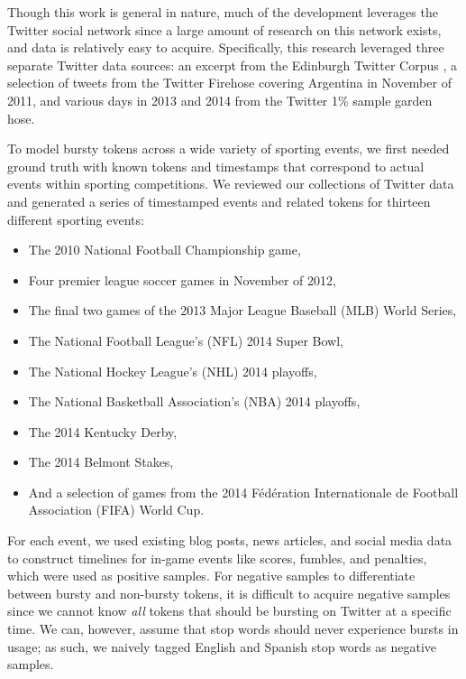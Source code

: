 \documentclass{acm_proc_article-sp}
\begin{document}
Though this work is general in nature, much of the development leverages the Twitter social network since a large amount of research on this network exists, and data is relatively easy to acquire.
Specifically, this research leveraged three separate Twitter data sources: an excerpt from the Edinburgh Twitter Corpus \cite{Petrovic:2010:ETC:1860667.1860680}, a selection of tweets from the Twitter Firehose covering Argentina in November of 2011, and various days in 2013 and 2014 from the Twitter 1\% sample garden hose.

To model bursty tokens across a wide variety of sporting events, we first needed ground truth with known tokens and timestamps that correspond to actual events within sporting competitions.
We reviewed our collections of Twitter data and generated a series of timestamped events and related tokens for thirteen different sporting events: 

\begin{itemize}
\item The 2010 National Football Championship game, 
\item Four premier league soccer games in November of 2012, %
\item The final two games of the 2013 Major League Baseball (MLB) World Series, 
\item The National Football League's (NFL) 2014 Super Bowl, 
\item The National Hockey League's (NHL) 2014 playoffs, 
\item The National Basketball Association's (NBA) 2014 playoffs, 
\item The 2014 Kentucky Derby, 
\item The 2014 Belmont Stakes, 
\item And a selection of games from the 2014 F\'{e}d\'{e}ration Internationale de Football Association (FIFA) World Cup.
\end{itemize}

For each event, we used existing blog posts, news articles, and social media data to construct timelines for in-game events like scores, fumbles, and penalties, which were used as positive samples.
For negative samples to differentiate between bursty and non-bursty tokens, it is difficult to acquire negative samples since we cannot know \emph{all} tokens that should be bursting on Twitter at a specific time.
We can, however, assume that stop words should never experience bursts in usage; as such, we naively tagged English and Spanish stop words as negative samples.
\end{document}
